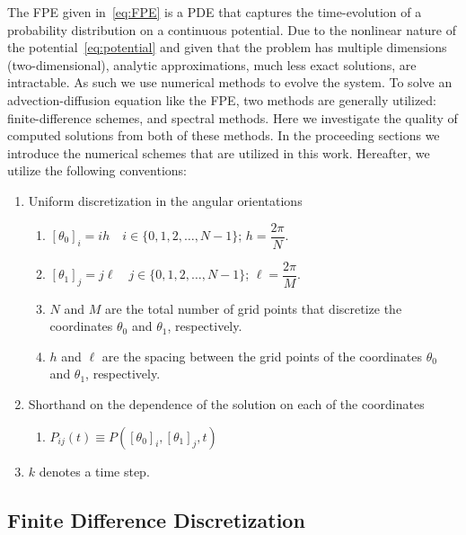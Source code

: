 \documentclass[10pt]{article}
\begin{document}
The FPE given in~\eqref{eq:FPE} is a PDE that captures the time-evolution of a probability distribution on a continuous potential. Due to the nonlinear nature of the potential~\eqref{eq:potential} and given that the problem has multiple dimensions (two-dimensional), analytic approximations, much less exact solutions, are intractable. As such we use numerical methods to evolve the system. To solve an advection-diffusion equation like the FPE, two methods are generally utilized: finite-difference schemes, and spectral methods. Here we investigate the quality of computed solutions from both of these methods. In the proceeding sections we introduce the numerical schemes that are utilized in this work. Hereafter, we utilize the following conventions:
\begin{enumerate}
    \item Uniform discretization in the angular orientations
    \begin{enumerate}[label=--]
        \item $\left[\theta_{0}\right]_{i} = ih\quad i\in\{0, 1, 2, \dots, N-1\}$; $h = \dfrac{2\pi}{N}$.
        \item $\left[\theta_{1}\right]_{j} = j\ell\quad j\in\{0, 1, 2, \dots, N-1\}$; $\ell = \dfrac{2\pi}{M}$.
        \item $N$ and $M$ are the total number of grid points that discretize the coordinates $\theta_{0}$ and $\theta_{1}$, respectively.
        \item $h$ and $\ell$ are the spacing between the grid points of the coordinates $\theta_{0}$ and $\theta_{1}$, respectively.
    \end{enumerate}
    \item Shorthand on the dependence of the solution on each of the coordinates
    \begin{enumerate}[label=--]
        \item $P_{ij}(t) \equiv P\left(\left[\theta_{0}\right]_{i},\left[\theta_{1}\right]_{j},t\right)$
    \end{enumerate}
    \item $k$ denotes a time step. 
\end{enumerate}

\subsection{Finite Difference Discretization}
\end{document}
